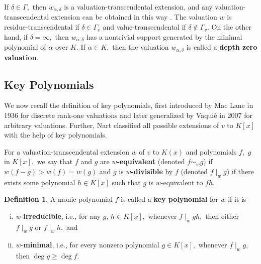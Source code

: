 \documentclass[11pt]{amsart}
\theoremstyle{definition}
\newtheorem{definition}[theorem]{Definition}
\theoremstyle{remark}
\numberwithin{equation}{section}
\begin{document}
If  $\delta\in\Gamma,$ then $w_{\alpha,\delta}$ is a valuation-transcendental extension, and any valuation-transcendental extension can be obtained in this way \cite[Corollary 3.7]{W}. The valuation $w$ is residue-transcendental if $\delta\in\Gamma_{\overline{v}}$ and value-transcendental if $\delta\notin\Gamma_{\overline{v}}$. On the other hand, if $\delta=\infty,$ then $w_{\alpha,\delta}$ has a nontrivial support generated by the minimal polynomial of $\alpha$ over $K.$ If $\alpha\in K,$ then the valuation $w_{\alpha,\delta}$ is called a {\bf depth zero valuation}.

\subsection{Key Polynomials}

We now recall the definition of key polynomials, first introduced by Mac Lane \cite{M} in 1936 for discrete rank-one valuations and later generalized by Vaqui\'e \cite{V} in 2007 for arbitrary valuations. Further, Nart \cite{EN1} classified all possible extensions of $v$ to $K[x]$ with the help of key polynomials.

For a valuation-transcendental extension  $w$ of $v$ to $K(x)$ and polynomials $f,$ $g$ in $K[x],$ we say that $f$ and $g$ are {\bf $w$-equivalent} (denoted $f\sim_w g$)  if $w(f-g)>w(f)=w(g)$ and $g$ is {\bf $w$-divisible} by $f$ (denoted $f\mid_{w} g$)  if there exists some polynomial $h \in K[x]$ such that $g$ is $w$-equivalent to $fh.$

		\begin{definition}
		A monic polynomial $f$   is called a  {\bf  key polynomial} for $w$ if it is
		\begin{enumerate}[(i)]
			\item  $w$-{\bf irreducible}, i.e., for any $g,\, h\in K[x],$ whenever $f\mid_{w} gh,$ then either $f\mid_{w}g $ or $f\mid_{w}h,$ and 
			\item $w$-{\bf minimal}, i.e., for every nonzero polynomial $g\in K[x],$ whenever $f\mid_{w}g,$ then $\deg g\geq \deg f.$
		\end{enumerate}
	\end{definition}
	
\end{document}
